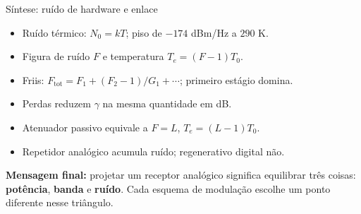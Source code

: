 
\begin{frame}{Síntese: ruído de hardware e enlace}

\begin{itemize}
\item Ruído térmico: $N_0 = kT$; piso de $-174$ dBm/Hz a $290$ K.
\item Figura de ruído $F$ e temperatura $T_e = (F-1)T_0$.
\item Friis: $F_{\text{tot}} = F_1 + (F_2-1)/G_1 + \cdots$; primeiro estágio domina.
\item Perdas reduzem $\gamma$ na mesma quantidade em dB.
\item Atenuador passivo equivale a $F = L$, $T_e = (L-1)T_0$.
\item Repetidor analógico acumula ruído; regenerativo digital não.
\end{itemize}

\vspace{0.3cm}

\textbf{Mensagem final:} projetar um receptor analógico significa equilibrar três coisas: \textbf{potência}, \textbf{banda} e \textbf{ruído}. Cada esquema de modulação escolhe um ponto diferente nesse triângulo.

\end{frame}
